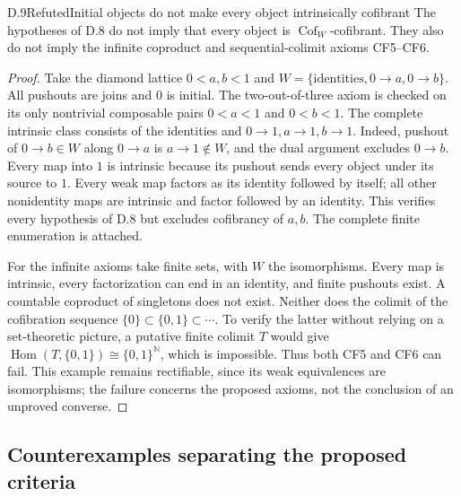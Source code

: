\begin{result}{D.9}{Refuted}{Initial objects do not make every object intrinsically cofibrant}
The hypotheses of D.8 do not imply that every object is
$\operatorname{Cof}_W$-cofibrant. They also do not imply the infinite
coproduct and sequential-colimit axioms CF5--CF6.
\end{result}
\begin{proof}
Take the diamond lattice $0<a,b<1$ and
$W=\{\text{identities},0\to a,0\to b\}$.
All pushouts are joins and $0$ is initial. The two-out-of-three
axiom is checked on its only nontrivial composable pairs
$0<a<1$ and $0<b<1$. The complete intrinsic class consists of
the identities and $0\to1,a\to1,b\to1$. Indeed, pushout of
$0\to b\in W$ along $0\to a$ is $a\to1\notin W$, and the
dual argument excludes $0\to b$. Every map into $1$ is intrinsic
because its pushout sends every object under its source to $1$.
Every weak map factors as its identity followed by itself; all
other nonidentity maps are intrinsic and factor followed by an
identity. This verifies every hypothesis of D.8 but excludes
cofibrancy of $a,b$. The complete finite enumeration is attached.

For the infinite axioms take finite sets, with $W$ the
isomorphisms. Every map is intrinsic, every factorization can end
in an identity, and finite pushouts exist. A countable coproduct
of singletons does not exist. Neither does the colimit of the
cofibration sequence $\{0\}\subset\{0,1\}\subset\cdots$.
To verify the latter without relying on a set-theoretic picture,
a putative finite colimit $T$ would give
$\operatorname{Hom}(T,\{0,1\})\cong\{0,1\}^{\mathbb N}$,
which is impossible. Thus both CF5 and CF6 can fail. This
example remains rectifiable, since its weak equivalences are
isomorphisms; the failure concerns the proposed axioms, not the
conclusion of an unproved converse.
\end{proof}

\subsection{Counterexamples separating the proposed criteria}

